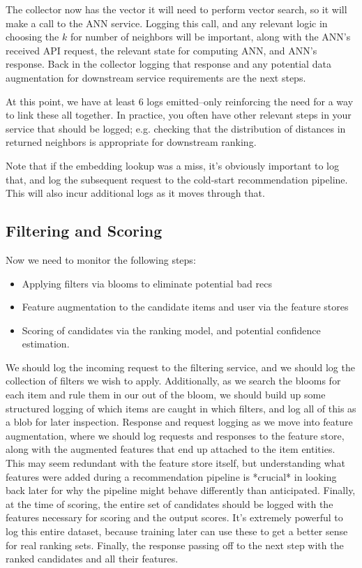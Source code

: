 The collector now has the vector it will need to perform vector search, so it will make a call to the ANN service. Logging this call, and any relevant logic in choosing the $k$ for number of neighbors will be important, along with the ANN's received API request, the relevant state for computing ANN, and ANN's response. Back in the collector logging that response and any potential data augmentation for downstream service requirements are the next steps. 

At this point, we have at least 6 logs emitted–only reinforcing the need for a way to link these all together. In practice, you often have other relevant steps in your service that should be logged; e.g. checking that the distribution of distances in returned neighbors is appropriate for downstream ranking.

Note that if the embedding lookup was a miss, it's obviously important to log that, and log the subsequent request to the cold-start recommendation pipeline. This will also incur additional logs as it moves through that.

\subsection{Filtering and Scoring}

Now we need to monitor the following steps:

\begin{itemize}
\item Applying filters via blooms to eliminate potential bad recs
\item Feature augmentation to the candidate items and user via the feature stores
\item Scoring of candidates via the ranking model, and potential confidence estimation.
\end{itemize}

We should log the incoming request to the filtering service, and we should log the collection of filters we wish to apply. Additionally, as we search the blooms for each item and rule them in our out of the bloom, we should build up some structured logging of which items are caught in which filters, and log all of this as a blob for later inspection. Response and request logging as we move into feature augmentation, where we should log requests and responses to the feature store, along with the augmented features that end up attached to the item entities. This may seem redundant with the feature store itself, but understanding what features were added during a recommendation pipeline is *crucial* in looking back later for why the pipeline might behave differently than anticipated. Finally, at the time of scoring, the entire set of candidates should be logged with the features necessary for scoring and the output scores. It's extremely powerful to log this entire dataset, because training later can use these to get a better sense for real ranking sets. Finally, the response passing off to the next step with the ranked candidates and all their features.

